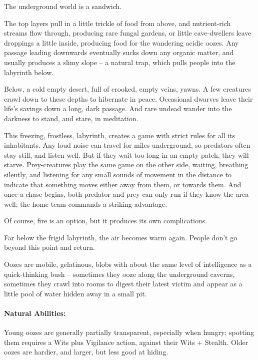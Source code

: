 \begin{multicols}{2}

\noindent
The underground world is a sandwich.

The top layers pull in a little trickle of food from above, and nutrient-rich streams flow through, producing rare fungal gardens, or little cave-dwellers leave droppings a little inside, producing food for the wandering acidic oozes.
Any passage leading downwards eventually sucks down any organic matter, and usually produces a slimy slope -- a natural trap, which pulls people into the labyrinth below.

Below, a cold empty desert, full of crooked, empty veins, yawns.
A few creatures crawl down to these depths to hibernate in peace.
Occasional dwarves leave their life's savings down a long, dark passage.
And rare undead wander into the darkness to stand, and stare, in meditation.

This freezing, frostless, labyrinth, creates a game with strict rules for all its inhabitants.
Any loud noise can travel for miles underground, so predators often stay still, and listen well.
But if they wait too long in an empty patch, they will starve.
Prey-creatures play the same game on the other side, waiting, breathing silently, and listening for any small sounds of movement in the distance to indicate that something moves either away from them, or towards them.
And once a chase begins, both predator and prey can only run if they know the area well; the home-team commands a striking advantage.

Of course, fire is an option, but it produces its own complications.

Far below the frigid labyrinth, the air becomes warm again.
People don't go beyond this point and return.


\label{ooze}

Oozes are mobile, gelatinous, blobs with about the same level of intelligence as a quick-thinking bush -- sometimes they ooze along the underground caverns, sometimes they crawl into rooms to digest their latest victim and appear as a little pool of water hidden away in a small pit.

\paragraph{Natural Abilities:} Young oozes are generally partially transparent, especially when hungry; spotting them requires a Wits plus Vigilance action, against their Wits + Stealth.
Older oozes are hardier, and larger, but less good at hiding.


\end{multicols}
